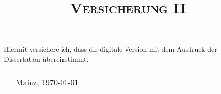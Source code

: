\documentclass{article}
\title{\scshape Versicherung II}
\date{}
\begin{document}
\maketitle
\thispagestyle{empty}


Hiermit versichere ich, dass die digitale Version mit dem Ausdruck der Dissertation übereinstimmt.
\bigskip\bigskip\bigskip\smallskip
%

\begin{tabular}{@{}p{.5in}p{3.5in}@{}}
& \hrulefill \\
& Mainz, \today
\end{tabular}
\end{document}
